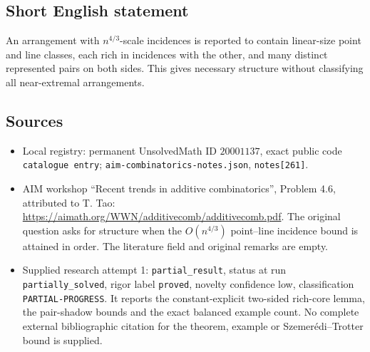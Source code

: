\documentclass[11pt]{article}
\begin{document}
\subsection{Short English statement}
An arrangement with \(n^{4/3}\)-scale incidences is reported to contain linear-size point and line classes, each rich in incidences with the other, and many distinct represented pairs on both sides. This gives necessary structure without classifying all near-extremal arrangements.
\subsection{Sources}
\begin{itemize}
\item Local registry: permanent UnsolvedMath ID \(20001137\), exact public code \texttt{catalogue entry}; \texttt{aim-combinatorics-notes.json}, \texttt{notes[261]}.
\item AIM workshop ``Recent trends in additive combinatorics'', Problem 4.6, attributed to T. Tao: \url{https://aimath.org/WWN/additivecomb/additivecomb.pdf}. The original question asks for structure when the \(O(n^{4/3})\) point--line incidence bound is attained in order. The literature field and original remarks are empty.
\item Supplied research attempt 1: \texttt{partial\_result}, status at run \texttt{partially\_solved}, rigor label \texttt{proved}, novelty confidence low, classification \texttt{PARTIAL-PROGRESS}. It reports the constant-explicit two-sided rich-core lemma, the pair-shadow bounds and the exact balanced example count. No complete external bibliographic citation for the theorem, example or Szemerédi--Trotter bound is supplied.
\end{itemize}
\end{document}
